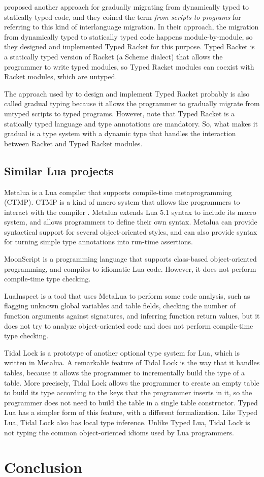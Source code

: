 \documentclass[preprint]{sig-alternate}
\begin{document}
\citet{tobin-hochstadt2006ims} proposed another approach for gradually
migrating from dynamically typed to statically typed code,
and they coined the term \textit{from scripts to programs} for
referring to this kind of interlanguage migration.
In their approach, the migration from dynamically typed to
statically typed code happens module-by-module, so they designed
and implemented Typed Racket \citep{tobin-hochstadt2008ts} for
this purpose.
Typed Racket is a statically typed version of Racket
(a Scheme dialect) that allows the programmer to write typed modules,
so Typed Racket modules can coexist with Racket modules,
which are untyped.

The approach used by \citet{tobin-hochstadt2008ts} to design and
implement Typed Racket probably is also called gradual typing
because it allows the programmer to gradually migrate from untyped
scripts to typed programs.
However, note that Typed Racket is a statically typed language
and type annotations are mandatory.
So, what makes it gradual is a type system with a dynamic type
that handles the interaction between Racket and Typed Racket modules.

\subsection{Similar Lua projects}

Metalua \citep{metalua} is a Lua compiler that supports compile-time
metaprogramming (CTMP).
CTMP is a kind of macro system that allows the programmers to interact
with the compiler \citep{fleutot2007contrasting}. 
Metalua extends Lua 5.1 syntax to include its macro system,
and allows programmers to define their own syntax.
Metalua can provide syntactical support for several object-oriented
styles, and can also provide syntax for turning simple type
annotations into run-time assertions.

MoonScript \citep{moonscript} is a programming language that supports
class-based object-oriented programming, and compiles to idiomatic
Lua code.
However, it does not perform compile-time type checking.

LuaInspect \citep{luainspect} is a tool that uses MetaLua to perform
some code analysis, such as flagging unknown global variables and
table fields, checking the number of function arguments against
signatures, and inferring function return values, but it does not
try to analyze object-oriented code and does not perform compile-time
type checking.

Tidal Lock \citep{tidallock} is a prototype of another optional type
system for Lua, which is written in Metalua.
A remarkable feature of Tidal Lock is the way that it handles tables,
because it allows the programmer to incrementally build the type of
a table.
More precisely, Tidal Lock allows the programmer to create an empty
table to build its type according to the keys that the programmer
inserts in it, so the programmer does not need to build the table in
a single table constructor.
Typed Lua has a simpler form of this feature, with a different
formalization.
Like Typed Lua, Tidal Lock also has local type inference.
Unlike Typed Lua, Tidal Lock is not typing the common object-oriented
idioms used by Lua programmers.

\section{Conclusion} \label{sec:con}



\end{document}
